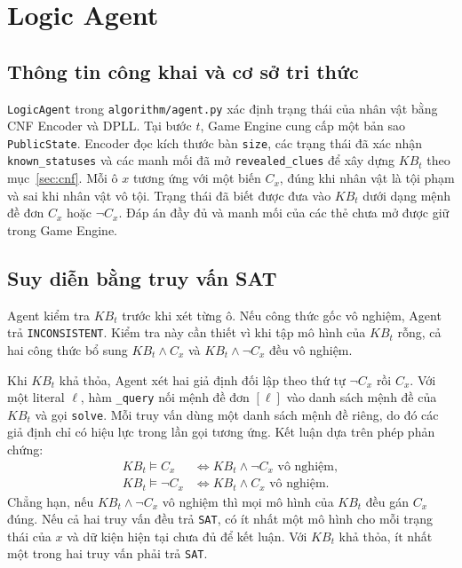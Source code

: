 \section{Logic Agent}
\label{sec:logic-agent}

\subsection{Thông tin công khai và cơ sở tri thức}

\texttt{LogicAgent} trong \texttt{algorithm/agent.py} xác định trạng thái của
nhân vật bằng CNF Encoder và DPLL. Tại bước $t$, Game Engine cung cấp một
bản sao \texttt{PublicState}. Encoder đọc kích thước bàn \texttt{size},
các trạng thái đã xác nhận \texttt{known\_statuses} và các manh mối đã mở
\texttt{revealed\_clues} để xây dựng $KB_t$ theo mục~\ref{sec:cnf}. Mỗi ô
$x$ tương ứng với một biến $C_x$, đúng khi nhân vật là tội phạm và sai khi
nhân vật vô tội. Trạng thái đã biết được đưa vào $KB_t$ dưới dạng mệnh đề
đơn $C_x$ hoặc $\neg C_x$. Đáp án đầy đủ và manh mối của các thẻ chưa mở
được giữ trong Game Engine.

\subsection{Suy diễn bằng truy vấn SAT}

Agent kiểm tra $KB_t$ trước khi xét từng ô. Nếu công thức gốc vô nghiệm,
Agent trả \texttt{INCONSISTENT}. Kiểm tra này cần thiết vì khi tập mô hình
của $KB_t$ rỗng, cả hai công thức bổ sung $KB_t \land C_x$ và
$KB_t \land \neg C_x$ đều vô nghiệm.

Khi $KB_t$ khả thỏa, Agent xét hai giả định đối lập theo thứ tự $\neg C_x$
rồi $C_x$. Với một literal $\ell$, hàm \texttt{\_query} nối mệnh đề đơn
$[\ell]$ vào danh sách mệnh đề của $KB_t$ và gọi \texttt{solve}. Mỗi truy vấn
dùng một danh sách mệnh đề riêng, do đó các giả định chỉ có hiệu lực trong
lần gọi tương ứng. Kết luận dựa trên phép phản chứng:
\begin{align*}
KB_t \models C_x
 &\iff KB_t \land \neg C_x \text{ vô nghiệm},\\
KB_t \models \neg C_x
 &\iff KB_t \land C_x \text{ vô nghiệm}.
\end{align*}
Chẳng hạn, nếu $KB_t \land \neg C_x$ vô nghiệm thì mọi mô hình của $KB_t$
đều gán $C_x$ đúng. Nếu cả hai truy vấn đều trả \texttt{SAT}, có ít nhất một
mô hình cho mỗi trạng thái của $x$ và dữ kiện hiện tại chưa đủ để kết luận.
Với $KB_t$ khả thỏa, ít nhất một trong hai truy vấn phải trả \texttt{SAT}.

